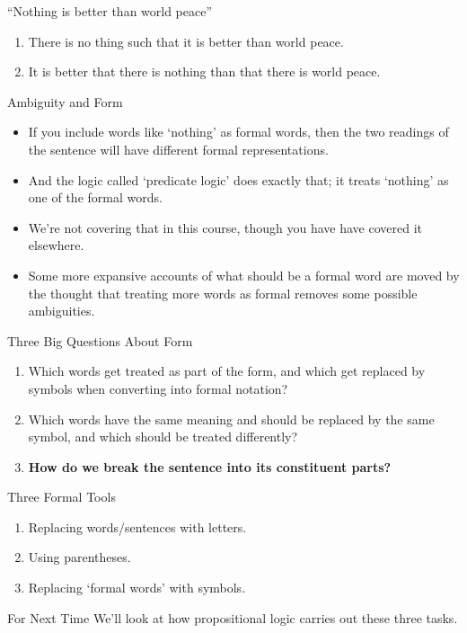 \documentclass[
  ignorenonframetext,
]{beamer}
\providecommand{\tightlist}{%
  \setlength{\itemsep}{0pt}\setlength{\parskip}{0pt}}
\renewcommand{\,}{\text{, }}
\begin{document}
\begin{frame}{``Nothing is better than world peace''}
\protect\hypertarget{nothing-is-better-than-world-peace}{}
\begin{enumerate}[<+->]
\tightlist
\item
  There is no thing such that it is better than world peace.
\item
  It is better that there is nothing than that there is world peace.
\end{enumerate}
\end{frame}

\begin{frame}{Ambiguity and Form}
\protect\hypertarget{ambiguity-and-form}{}
\begin{itemize}
\tightlist
\item
  If you include words like `nothing' as formal words, then the two
  readings of the sentence will have different formal representations.
\item
  And the logic called `predicate logic' does exactly that; it treats
  `nothing' as one of the formal words.
\item
  We're not covering that in this course, though you have have covered
  it elsewhere.
\item
  Some more expansive accounts of what should be a formal word are moved
  by the thought that treating more words as formal removes some
  possible ambiguities.
\end{itemize}
\end{frame}

\begin{frame}{Three Big Questions About Form}
\protect\hypertarget{three-big-questions-about-form-2}{}
\begin{enumerate}
\tightlist
\item
  Which words get treated as part of the form, and which get replaced by
  symbols when converting into formal notation?
\item
  Which words have the same meaning and should be replaced by the same
  symbol, and which should be treated differently?
\item
  \textbf{How do we break the sentence into its constituent parts?}
\end{enumerate}
\end{frame}

\begin{frame}{Three Formal Tools}
\protect\hypertarget{three-formal-tools}{}
\begin{enumerate}[<+->]
\tightlist
\item
  Replacing words/sentences with letters.
\item
  Using parentheses.
\item
  Replacing `formal words' with symbols.
\end{enumerate}
\end{frame}

\begin{frame}{For Next Time}
\protect\hypertarget{for-next-time}{}
We'll look at how propositional logic carries out these three tasks.
\end{frame}
\end{document}
